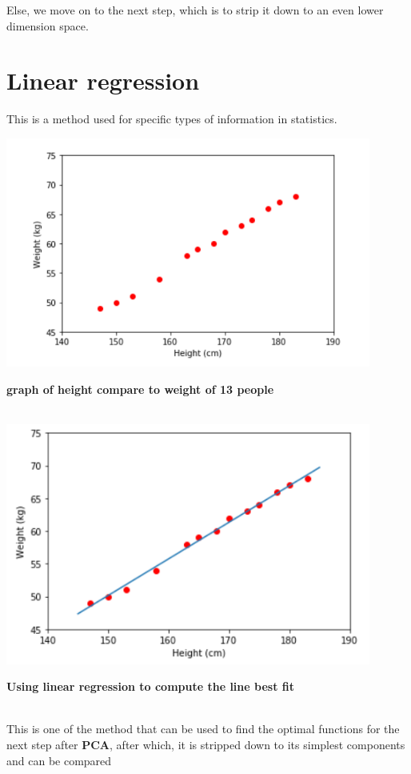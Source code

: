\documentclass{article}
\begin{document}
Else, we move on to the next step, which is to strip it down to an even lower dimension space.

\section{Linear regression}

This is a method used for specific types of information in statistics.

\includegraphics[width=12cm]{Capture2.PNG}\\

\centerline{\textbf{\small{graph of height compare to weight of 13 people}}}\\

\includegraphics[width=12cm]{Capture3.PNG}\\

\centerline{\textbf{\small{Using linear regression to compute the line best fit}}}\\

This is one of the method that can be used to find the optimal functions for the next step after \textbf{PCA}, after which, it is stripped down to its simplest components and can be compared
\end{document}
